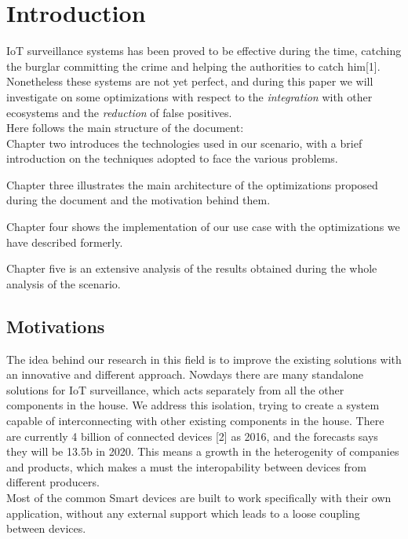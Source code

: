 \chapter{Introduction}

IoT surveillance systems has been proved to be effective during the time,
catching the burglar committing the crime and helping the authorities to
catch him[1]. Nonetheless these systems are not yet perfect, and during
this paper we will investigate on some optimizations with respect to
the \textit{integration} with other ecosystems and the \textit{reduction}
of false positives.\\
Here follows the main structure of the document:\\

Chapter two introduces the technologies used in our scenario, with a brief
introduction on the techniques adopted to face the various problems.

Chapter three illustrates the main architecture of the optimizations proposed
during the document and the motivation behind them.

Chapter four shows the implementation of our use case with the optimizations
we have described formerly.

Chapter five is an extensive analysis of the results obtained during the whole
analysis of the scenario.

\section{Motivations}

The idea behind our research in this field is to improve the existing solutions
with an innovative and different approach. Nowdays there are many standalone
solutions for IoT surveillance, which acts separately from all the other
components in the house. We address this isolation, trying to create
a system capable of interconnecting with other existing components in the house.
There are currently 4 billion of connected devices [2] as 2016, and the forecasts
says they will be 13.5b in 2020. This means a growth in the heterogenity of companies
and products, which makes a must the interopability between devices from different
producers.\\
Most of the common Smart devices are built to work specifically with their own application,
without any external support which leads to a loose coupling between devices.

